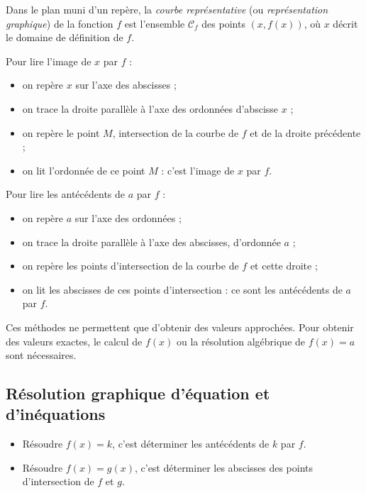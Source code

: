 \begin{definition}
  Dans le plan muni d'un repère, la \emph{courbe représentative} (ou \emph{représentation graphique}) de la fonction $f$ est l'ensemble $\mathcal{C}_f$ des points $(x, f(x))$, où $x$ décrit le domaine de définition de $f$.
\end{definition}

\begin{methode}
  Pour lire l'image de $x$ par $f$ :
  \begin{itemize}
    \item on repère $x$ sur l'axe des abscisses ;
    \item on trace la droite parallèle à l'axe des ordonnées d'abscisse $x$ ;
    \item on repère le point $M$, intersection de la courbe de $f$ et de la droite précédente ;
    \item on lit l'ordonnée de ce point $M$ : c'est l'image de $x$ par $f$.
  \end{itemize}
\end{methode}

\begin{methode}
  Pour lire les antécédents de $a$ par $f$ :
  \begin{itemize}
    \item on repère $a$ sur l'axe des ordonnées ;
    \item on trace la droite parallèle à l'axe des abscisses, d'ordonnée $a$ ;
    \item on repère les points d'intersection de la courbe de $f$ et cette droite ;
    \item on lit les abscisses de ces points d'intersection : ce sont les antécédents de $a$ par $f$.
  \end{itemize}
\end{methode}

\begin{remarque}
  Ces méthodes ne permettent que d'obtenir des valeurs approchées. Pour obtenir des valeurs exactes, le calcul de $f(x)$ ou la résolution algébrique de $f(x)=a$ sont nécessaires.
\end{remarque}

\subsection{Résolution graphique d'équation et d'inéquations}

\begin{propriete}
  \begin{itemize}
    \item Résoudre $f(x)=k$, c'est déterminer les antécédents de $k$ par $f$.
    \item Résoudre $f(x)=g(x)$, c'est déterminer les abscisses des points d'intersection de $f$ et $g$.
  \end{itemize}
\end{propriete}

